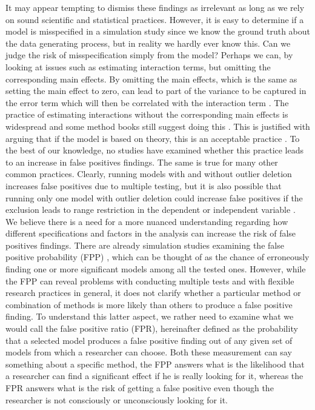 It may appear tempting to dismiss these findings as irrelevant as long as we rely on sound scientific and statistical practices. However, it is easy to determine if a model is misspecified in a simulation study since we know the ground truth about the data generating process, but in reality we hardly ever know this. Can we judge the risk of misspecification simply from the model? Perhaps we can, by looking at issues such as estimating interaction terms, but omitting the corresponding main effects. By omitting the main effects, which is the same as setting the main effect to zero, can lead to part of the variance to be captured in the error term which will then be correlated with the interaction term \citep{Branbor2006}. The practice of estimating interactions without the corresponding main effects is widespread \citep{Branbor2006} and some method books still suggest doing this \citep{Cleves2008}. This is justified with arguing that if the model is based on theory, this is an acceptable practice \citep{aiken1991multiple}. To the best of our knowledge, no studies have examined whether this practice leads to an increase in false positives findings. The same is true for many other common practices. Clearly, running models with and without outlier deletion increases false positives due to multiple testing, but it is also possible that running only one model with outlier deletion could increase false positives if the exclusion leads to range restriction in the dependent or independent variable \citep{Raju2003}. \\        

We believe there is a need for a more nuanced understanding regarding how different specifications and factors in the analysis can increase the risk of false positives findings. There are already simulation studies examining the false positive probability (FPP) \citep{Simmons2011}, which can be thought of as the chance of erroneously finding one or more significant models among all the tested ones. However, while the FPP can reveal problems with conducting multiple tests and with flexible research practices in general, it does not clarify whether a particular method or combination of methods is more likely than others to produce a false positive finding. To understand this latter aspect, we rather need to examine what we would call the false positive ratio (FPR), hereinafter defined as the probability that a selected model produces a false positive finding out of any given set of models from which a researcher can choose. Both these measurement can say something about a specific method, the FPP answers what is the likelihood that a researcher can find a significant effect if he is really looking for it, whereas the FPR answers what is the risk of getting a false positive even though the researcher is not consciously or unconsciously looking for it. \\

